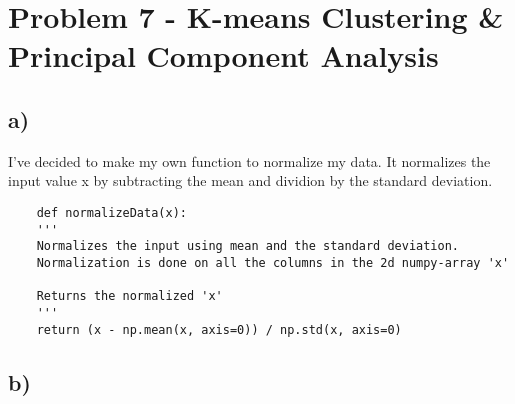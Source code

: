 \section{Problem 7 - K-means Clustering \& Principal Component Analysis}

\subsection {a)}
I've decided to make my own function to normalize my data. It normalizes the input
value x by subtracting the mean and dividion by the standard deviation.
\begin{verbatim}
    def normalizeData(x):
    '''
    Normalizes the input using mean and the standard deviation.
    Normalization is done on all the columns in the 2d numpy-array 'x'

    Returns the normalized 'x'
    '''
    return (x - np.mean(x, axis=0)) / np.std(x, axis=0)
\end{verbatim}

\subsection {b)}




